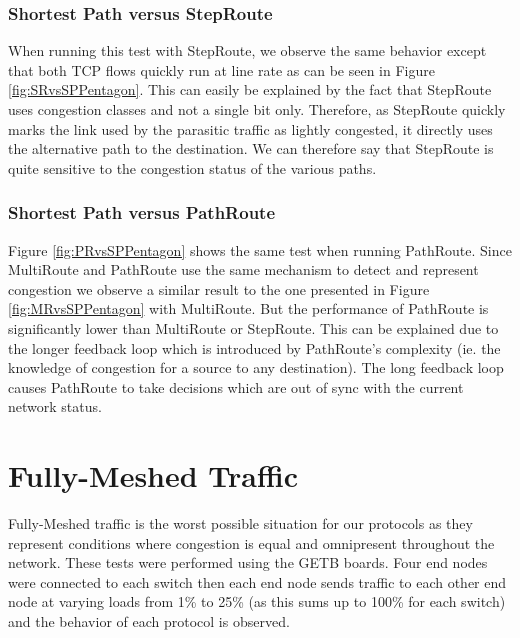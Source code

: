 
\subsubsection{Shortest Path versus StepRoute}

When running this test with StepRoute, we observe the same behavior except that both TCP flows quickly run at line rate as can be seen in Figure \ref{fig:SRvsSPPentagon}. This can easily be explained by the fact that StepRoute uses congestion classes and not a single bit only. Therefore, as StepRoute quickly marks the link used by the parasitic traffic as lightly congested, it directly uses the alternative path to the destination. We can therefore say that StepRoute is quite sensitive to the congestion status of the various paths. 


\subsubsection{Shortest Path versus PathRoute}

Figure \ref{fig:PRvsSPPentagon} shows the same test when running PathRoute. Since MultiRoute and PathRoute use the same mechanism to detect and represent congestion we observe a similar result to the one presented in Figure \ref{fig:MRvsSPPentagon} with MultiRoute. But the performance of PathRoute is significantly lower than  MultiRoute or StepRoute. This can be explained due to the longer feedback loop which is introduced by PathRoute's complexity (ie. the knowledge of congestion for a source to any destination). The long feedback loop causes PathRoute to take decisions which are out of sync with the current network status.


\section{Fully-Meshed Traffic}

Fully-Meshed traffic is the worst possible situation for our protocols as they represent conditions where congestion is equal and omnipresent throughout the network. These tests were performed using the GETB boards. Four end nodes were connected to each switch then each end node sends traffic to each other end node at varying loads from 1\% to 25\% (as this sums up to 100\% for each switch) and the behavior of each protocol is observed. 

